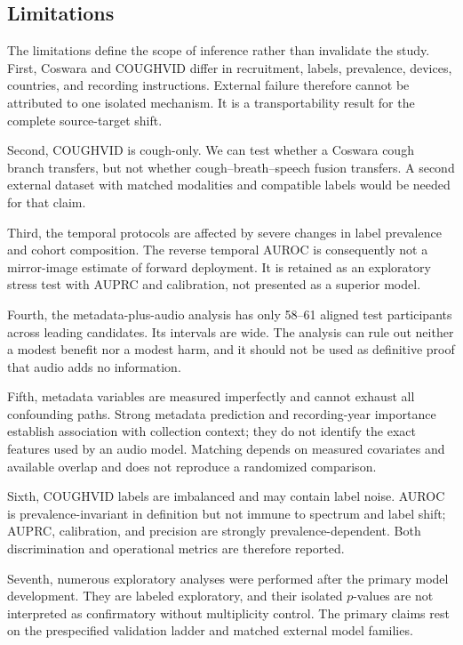 \subsection{Limitations}

The limitations define the scope of inference rather than invalidate the
study. First, Coswara and COUGHVID differ in recruitment, labels, prevalence,
devices, countries, and recording instructions. External failure therefore
cannot be attributed to one isolated mechanism. It is a transportability
result for the complete source-target shift.

Second, COUGHVID is cough-only. We can test whether a Coswara cough branch
transfers, but not whether cough--breath--speech fusion transfers. A second
external dataset with matched modalities and compatible labels would be needed
for that claim.

Third, the temporal protocols are affected by severe changes in label
prevalence and cohort composition. The reverse temporal AUROC is consequently
not a mirror-image estimate of forward deployment. It is retained as an
exploratory stress test with AUPRC and calibration, not presented as a superior
model.

Fourth, the metadata-plus-audio analysis has only 58--61 aligned test
participants across leading candidates. Its intervals are wide. The analysis
can rule out neither a modest benefit nor a modest harm, and it should not be
used as definitive proof that audio adds no information.

Fifth, metadata variables are measured imperfectly and cannot exhaust all
confounding paths. Strong metadata prediction and recording-year importance
establish association with collection context; they do not identify the exact
features used by an audio model. Matching depends on measured covariates and
available overlap and does not reproduce a randomized comparison.

Sixth, COUGHVID labels are imbalanced and may contain label noise. AUROC is
prevalence-invariant in definition but not immune to spectrum and label shift;
AUPRC, calibration, and precision are strongly prevalence-dependent. Both
discrimination and operational metrics are therefore reported.

Seventh, numerous exploratory analyses were performed after the primary model
development. They are labeled exploratory, and their isolated $p$-values are
not interpreted as confirmatory without multiplicity control. The primary
claims rest on the prespecified validation ladder and matched external model
families.

